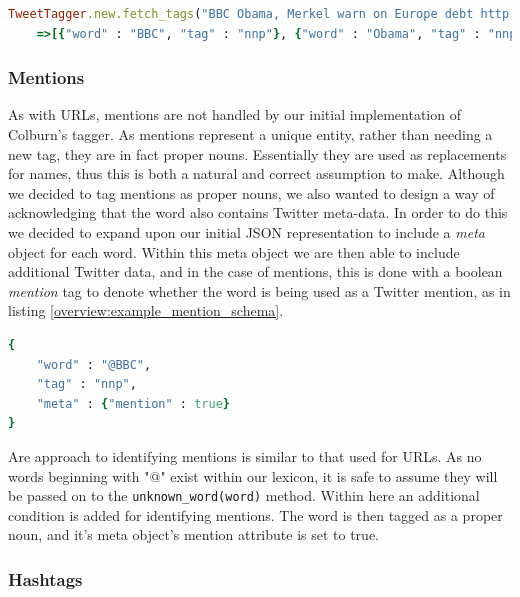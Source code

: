 \begin{lstlisting}[language=Ruby, numbers=none, caption={Example use of split function}, label=overview:example_url_function]
TweetTagger.new.fetch_tags("BBC Obama, Merkel warn on Europe debt http://bbc.in/jfZW3I")
	=>[{"word" : "BBC", "tag" : "nnp"}, {"word" : "Obama", "tag" : "nnp"}, {"word" : ",", "tag" : "ppc"}, {"word" : "Merkel", "tag" : "nnp"}, {"word" : "warn", "tag" : "vbp"}, {"word" : "on", "tag" : "in"}, {"word" : "Europe", "tag" : "nnp"}, {"word" : "debt", "tag" : "nn"}, {"word" : "http://bbc.in/jfZW3I", "tag" : "url"}] 
\end{lstlisting}

\subsubsection{Mentions}

As with URLs, mentions are not handled by our initial implementation of Colburn's tagger. As mentions represent a unique entity, rather than needing a new tag, they are in fact proper nouns. Essentially they are used as replacements for names, thus this is both a natural and correct assumption to make. Although we decided to tag mentions as proper nouns, we also wanted to design a way of acknowledging that the word also contains Twitter meta-data. In order to do this we decided to expand upon our initial JSON representation to include a \emph{meta} object for each word. Within this meta object we are then able to include additional Twitter data, and in the case of mentions, this is done with a boolean \emph{mention} tag to denote whether the word is being used as a Twitter mention, as in listing \ref{overview:example_mention_schema}.

\begin{lstlisting}[language=Ruby, numbers=none, caption={Example JSON structure for representing a mention word}, label=overview:example_mention_schema]
{
	"word" : "@BBC", 
	"tag" : "nnp",
	"meta" : {"mention" : true}
}
\end{lstlisting}

Are approach to identifying mentions is similar to that used for URLs. As no words beginning with "@" exist within our lexicon, it is safe to assume they will be passed on to the \texttt{unknown\_word(word)} method. Within here an additional condition is added for identifying mentions. The word is then tagged as a proper noun, and it's meta object's mention attribute is set to true.

\subsubsection{Hashtags}


